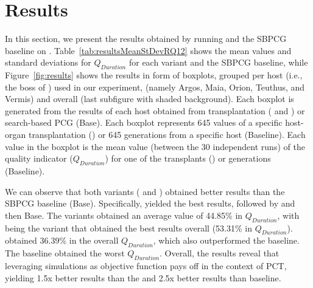 \section{Results}
\label{sec:Results}

In this section, we present the results obtained by running \ApproachName{} and the SBPCG baseline on \CaseStudy{}.
Table~\ref{tab:resultsMeanStDevRQ12} shows the mean values and standard deviations for $Q_{Duration}$ for each \ApproachName{} variant and the SBPCG baseline, while Figure~\ref{fig:results} shows the results in form of boxplots, grouped per host (i.e., the boss of \CaseStudy{}) used in our experiment, (namely Argos, Maia, Orion, Teuthus, and Vermis) and overall (last subfigure with shaded background).  
Each boxplot is generated from the results of each host obtained from transplantation \ApproachName{} (\simhotep{} and \timhotep{}) or search-based PCG (Base). Each boxplot represents 645 values of a specific host-organ transplantation (\ApproachName{}) or 645 generations from a specific host (Baseline). Each value in the boxplot is the mean value (between the 30 independent runs) of the quality indicator ($Q_{Duration}$) for one of the transplants (\ApproachName{}) or generations (Baseline). 

We can observe that both variants (\simhotep{} and \timhotep{}) obtained better results than the SBPCG baseline (Base). Specifically, \simhotep{} yielded the best results, followed by \timhotep{} and then Base. The variants obtained an average value of 44.85\% in $Q_{Duration}$, with \simhotep{} being the variant that obtained the best results overall (53.31\% in $Q_{Duration}$). \timhotep obtained 36.39\% in the overall $Q_{Duration}$, which also outperformed the baseline. The baseline obtained the worst $Q_{Duration}$. Overall, the results reveal that leveraging simulations as objective function pays off in the context of PCT, yielding 1.5x better results than the \timhotep{} and 2.5x better results than baseline.

